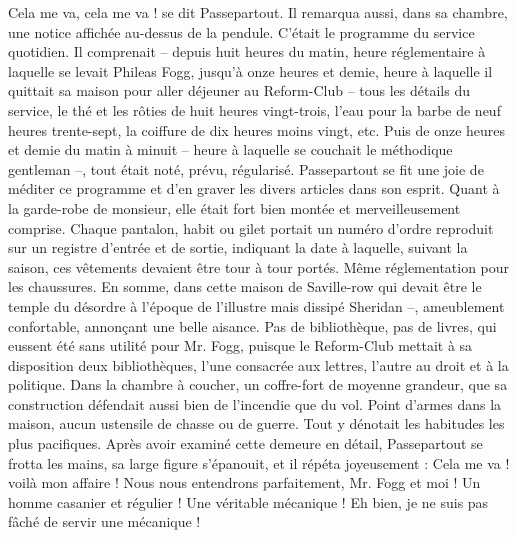 \documentclass[12pt,a4paper,openany]{book}
\begin{document}
                \og Cela me va, cela me va ! \fg se dit Passepartout.
                Il remarqua aussi, dans sa chambre, une notice affichée au-dessus de la pendule. C’était le programme du service quotidien. Il comprenait – depuis huit heures du matin, heure réglementaire à laquelle se levait Phileas Fogg, jusqu’à onze heures et demie, heure à laquelle il quittait sa maison pour aller déjeuner au Reform-Club – tous les détails du service, le thé et les rôties de huit heures vingt-trois, l’eau pour la barbe de neuf heures trente-sept, la coiffure de dix heures moins vingt, etc. Puis de onze heures et demie du matin à minuit – heure à laquelle se couchait le méthodique gentleman –, tout était noté, prévu, régularisé. Passepartout se fit une joie de méditer ce programme et d’en graver les divers articles dans son esprit.
                Quant à la garde-robe de monsieur, elle était fort bien montée et merveilleusement comprise. Chaque pantalon, habit ou gilet portait un numéro d’ordre reproduit sur un registre d’entrée et de sortie, indiquant la date à laquelle, suivant la saison, ces vêtements devaient être tour à tour portés. Même réglementation pour les chaussures.
                En somme, dans cette maison de Saville-row qui devait être le temple du désordre à l’époque de l’illustre mais dissipé Sheridan –, ameublement confortable, annonçant une belle aisance. Pas de bibliothèque, pas de livres, qui eussent été sans utilité pour Mr. Fogg, puisque le Reform-Club mettait à sa disposition deux bibliothèques, l’une consacrée aux lettres, l’autre au droit et à la politique. Dans la chambre à coucher, un coffre-fort de moyenne grandeur, que sa construction défendait aussi bien de l’incendie que du vol. Point d’armes dans la maison, aucun ustensile de chasse ou de guerre. Tout y dénotait les habitudes les plus pacifiques.
                Après avoir examiné cette demeure en détail, Passepartout se frotta les mains, sa large figure s’épanouit, et il répéta joyeusement :
                \og Cela me va ! voilà mon affaire ! Nous nous entendrons parfaitement, Mr. Fogg et moi ! Un homme casanier et régulier ! Une véritable mécanique ! Eh bien, je ne suis pas fâché de servir une mécanique ! \fg
                
            
            
\end{document}
